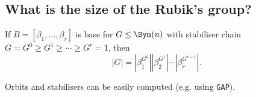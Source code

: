 \subsection{What is the size of the Rubik's group?}

\begin{slide}
    \begin{theorem}
        \vspace{0pt}
        If $B = [\beta_1,\dotsc,\beta_r]$ is base for $G \leq \Sym(n)$ with stabiliser chain $G = G^0 \geq G^1 \geq \dotsb \geq G^r = 1$, then
        $$|G| = |\beta_1^{G^0}||\beta_2^{G^1}| \dotsb |\beta_r^{G^{r-1}}|.$$
    \end{theorem}

    Orbits and stabilisers can be easily computed (e.g. using \texttt{GAP}).


\end{slide}